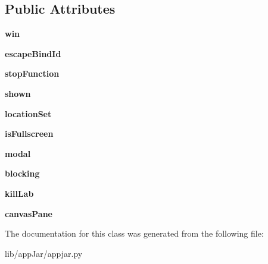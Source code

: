\subsection*{Public Attributes}
\begin{DoxyCompactItemize}
\item 
\mbox{\label{classappjar_1_1_sub_window_a2d7445ca8622c24a7ad72719639b8cd5}} 
{\bfseries win}
\item 
\mbox{\label{classappjar_1_1_sub_window_a3da083be740dae5ba1825561207e1be4}} 
{\bfseries escape\+Bind\+Id}
\item 
\mbox{\label{classappjar_1_1_sub_window_ab36b687194b9c1357dc07e82d8174bb2}} 
{\bfseries stop\+Function}
\item 
\mbox{\label{classappjar_1_1_sub_window_ae9fa0d5651c5e7bd19d1d68b5366217f}} 
{\bfseries shown}
\item 
\mbox{\label{classappjar_1_1_sub_window_a650bb1334c4726b15c426c4565619c30}} 
{\bfseries location\+Set}
\item 
\mbox{\label{classappjar_1_1_sub_window_ab65b25c07d802809e3a04663bd8912b9}} 
{\bfseries is\+Fullscreen}
\item 
\mbox{\label{classappjar_1_1_sub_window_a3ba963be177eb623bed55ef19ffede2b}} 
{\bfseries modal}
\item 
\mbox{\label{classappjar_1_1_sub_window_a77c2ee18b333a6a62775a5f723cce7aa}} 
{\bfseries blocking}
\item 
\mbox{\label{classappjar_1_1_sub_window_aa0a032e6c8fb520b48fb66d45b077cfa}} 
{\bfseries kill\+Lab}
\item 
\mbox{\label{classappjar_1_1_sub_window_a051760d58697291cd613428bff92904a}} 
{\bfseries canvas\+Pane}
\end{DoxyCompactItemize}


The documentation for this class was generated from the following file\+:\begin{DoxyCompactItemize}
\item 
lib/app\+Jar/appjar.\+py\end{DoxyCompactItemize}
